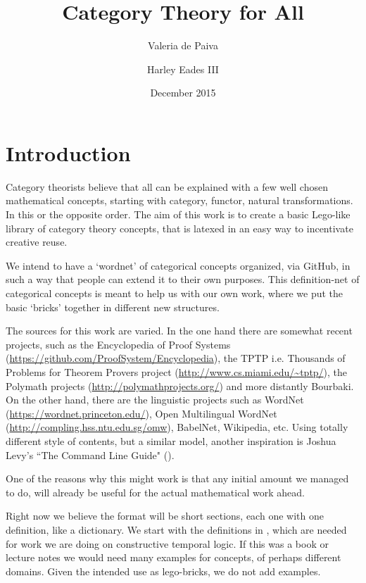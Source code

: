 \documentclass{article}
\title{Category Theory for All}
\author{Valeria de Paiva \and Harley Eades III}
\date{December 2015}
\begin{document}
\maketitle

\section*{Introduction}

Category theorists believe that all can be explained with a few well chosen mathematical concepts, starting with category, functor, natural transformations. In this or the opposite order. The aim of this work is to create a basic Lego-like library  of category theory concepts, that is latexed in an easy way to incentivate creative reuse. 

We intend to have a `wordnet' of categorical concepts organized, via GitHub, in such a way that people can extend it to their own purposes. This definition-net of categorical concepts is meant to help us with our own work, where we put the basic `bricks' together in different new structures.

The  sources for this work are varied. In the one hand there are somewhat recent projects, such as the  Encyclopedia of Proof Systems (\url{https://github.com/ProofSystem/Encyclopedia}), the TPTP i.e. Thousands of Problems for Theorem Provers project (\url{http://www.cs.miami.edu/~tptp/}),   the Polymath projects (\url{http://polymathprojects.org/}) and  more distantly Bourbaki. On the other hand, there are the linguistic projects such as WordNet (\url{https://wordnet.princeton.edu/}), Open Multilingual WordNet (\url{http://compling.hss.ntu.edu.sg/omw}), BabelNet, Wikipedia, etc.  Using totally  different style of contents, but a similar model, another inspiration is Joshua Levy's ``The Command Line Guide" (\url{}).

One of the reasons why this might work is that any initial amount we managed to do, will already be useful for the actual mathematical work ahead. 

Right now we believe the format will be short sections, each one  with one definition, like a dictionary. We start with the definitions in \citep{depaiva1996}, which are needed for work we are doing on constructive temporal logic. If this was a book or lecture notes we would need many examples for concepts, of perhaps different domains. Given the intended use as lego-bricks, we do not add examples.
\end{document}
